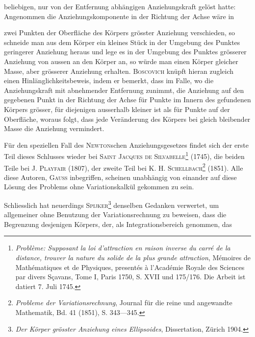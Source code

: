 beliebigen, nur von der Entfernung abhängigen Anziehungskraft gelöst hatte:
Angenommen die Anziehungskomponente in der Richtung der Achse wäre in
\par{}\par
\clearpage{}
\noindent zwei Punkten der Oberfläche des Körpers grösster Anziehung verschieden, so
schneide man aus dem Körper ein kleines Stück in der Umgebung des Punktes
geringerer Anziehung heraus und lege es in der Umgebung des Punktes grösserer
Anziehung von aussen an den Körper an, so würde man einen Körper gleicher
Masse, aber grösserer Anziehung erhalten. \textsc{Boscovich} knüpft hieran zugleich
einen Hinlänglichkeitsbeweis, indem er bemerkt, dass im Falle, wo die Anziehungskraft mit abnehmender Entfernung zunimmt, die Anziehung auf den
gegebenen Punkt in der Richtung der Achse für Punkte im Innern des gefundenen Körpers grösser, für diejenigen ausserhalb kleiner ist als für Punkte
auf der Oberfläche, woraus folgt, dass jede Veränderung des Körpers bei gleich
bleibender Masse die Anziehung vermindert.
\par\noindent\hspace*{\parindent}Für den speziellen Fall des \textsc{Newton}schen Anziehungsgesetzes findet sich
der erste Teil dieses Schlusses wieder bei \textsc{Saint Jacques de Silvabelle}\footnote{\textit{Problème: Supposant la loi d’attraction en raison inverse du carré de la distance, trouver la nature
du solide de la plus grande attraction}, Mémoires de Mathématiques et de Physiques, presentés à l’Académie
Royale des Sciences par divers Sçavans, Tome I, Paris 1750, S. XVII und 175/176. Die Arbeit ist datiert
7. Juli 1745.} (1745),
die beiden Teile bei J. \textsc{Playfair} (1807), der zweite Teil bei K. H. \textsc{Schellbach}\footnote{\textit{Probleme der Variationsrechnung}, Journal für die reine und angewandte Mathematik, Bd. 41 (1851),
S. 343—345.} (1851). Alle diese Autoren, \textsc{Gauss} inbegriffen, scheinen unabhängig
von einander auf diese Lösung des Problems ohne Variationskalkül gekommen
zu sein.
\par\noindent\hspace*{\parindent}Schliesslich hat neuerdings \textsc{Spijker}\footnote{\textit{Der Körper grösster Anziehung eines Ellipsoides}, Dissertation, Zürich 1904.} denselben Gedanken verwertet, um
allgemeiner ohne Benutzung der Variationsrechnung zu beweisen, dass die
Begrenzung desjenigen Körpers, der, als Integrationsbereich genommen, das
